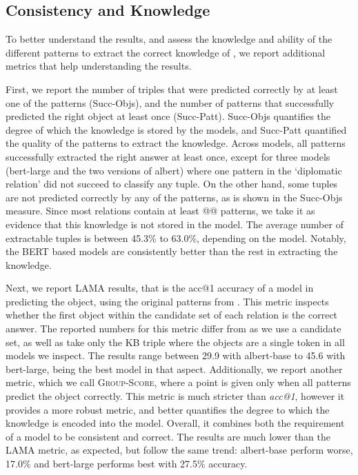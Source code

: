 % 


\subsection{Consistency and Knowledge}

To better understand the results, and assess the knowledge and ability of the different patterns to extract the correct knowledge of \resource{}, we report additional metrics that help understanding the results.

First, we report the number of triples that were predicted correctly by at least one of the patterns (Succ-Objs), and the number of patterns that successfully predicted the right object at least once (Succ-Patt). Succ-Objs quantifies the degree of which the knowledge is stored by the models, and Succ-Patt quantified the quality of the patterns to extract the knowledge.
Across models, all patterns successfully extracted the right
answer at least once, except for three models (bert-large and the two versions of albert) where one pattern in the `diplomatic relation'  did not succeed to classify any tuple.
On the other hand, some tuples are not predicted correctly by any of the patterns, as is shown in the Succ-Objs measure. Since most relations contain at least @@ patterns, we take it as evidence that this knowledge is not stored in the model. 
The average number of extractable tuples is between 45.3\% to 63.0\%, depending on the model. Notably, the BERT based models are consistently better than the rest in extracting the knowledge. 

Next, we report LAMA results, that is the acc@1 accuracy of a model in predicting the object, using the original patterns from \citet{lama}. This metric inspects whether the first object within the candidate set of each relation is the correct answer. The reported numbers for this metric differ from \citet{lama} as we use a candidate set, as well as take only the KB triple where the objects are a single token in all models we inspect. The results range between 29.9 with albert-base to 45.6 with bert-large, being the best model in that aspect.
Additionally, we report another metric, which we call \textsc{Group-Score}, where a point is given only when all patterns predict the object correctly. This metric is much stricter than \textit{acc@1}, however it provides a more robust metric, and better quantifies the degree to which the knowledge is encoded into the model. Overall, it combines both the requirement of a model to be consistent and correct. The results are much lower than the LAMA metric, as expected, but follow the same trend: albert-base perform worse, 17.0\% and bert-large performs best with 27.5\% accuracy.

